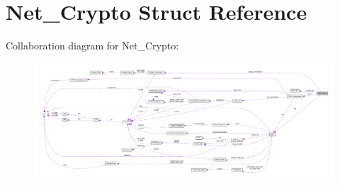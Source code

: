 \hypertarget{struct_net___crypto}{\section{Net\+\_\+\+Crypto Struct Reference}
\label{struct_net___crypto}
}


Collaboration diagram for Net\+\_\+\+Crypto\+:\nopagebreak
\begin{figure}[H]
\begin{center}
\leavevmode
\includegraphics[width=350pt]{struct_net___crypto__coll__graph}
\end{center}
\end{figure}

